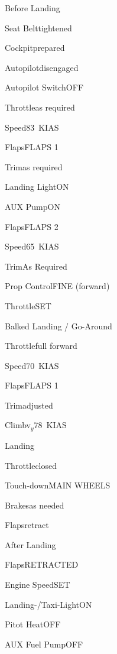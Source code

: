 \begin{checklist}{Before Landing}
  \item{Seat Belt}{tightened}
  \item{Cockpit}{prepared}
  \item{Autopilot}{disengaged}
  \item{Autopilot Switch}{OFF}
  \item{Throttle}{as required}
  \item{Speed}{83~KIAS}
  \item{Flaps}{FLAPS 1}
  \item{Trim}{as required}
  \item{Landing Light}{ON}
  \item{AUX Pump}{ON}
  \item{Flaps}{FLAPS 2}
  \item{Speed}{65~KIAS}
  \item{Trim}{As Required}
  \item{Prop Control}{FINE (forward)}
  \item{Throttle}{SET}
\end{checklist}

\begin{checklist}{Balked Landing / Go-Around}
  \item{Throttle}{full forward}
  \item{Speed}{70~KIAS}
  \item{Flaps}{FLAPS 1}
  \item{Trim}{adjusted}
  \item{Climb}{v$_{y}$78~KIAS} 
\end{checklist}

\begin{checklist}{Landing}
  \item{Throttle}{closed}
  \item{Touch-down}{MAIN WHEELS}
  \item{Brakes}{as needed}
  \item{Flaps}{retract}
\end{checklist}

\begin{checklist}{After Landing}
  \item{Flaps}{RETRACTED}
  \item{Engine Speed}{SET}
  \item{Landing-/Taxi-Light}{ON}
  \item{Pitot Heat}{OFF}
  \item{AUX Fuel Pump}{OFF}
\end{checklist}

